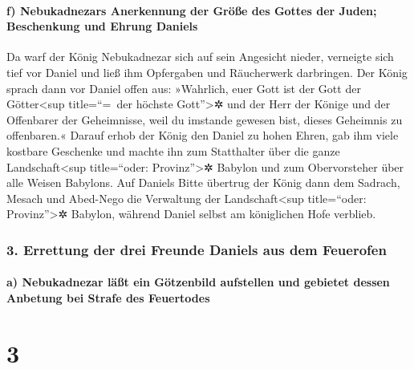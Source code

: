 \hypertarget{f-nebukadnezars-anerkennung-der-gruxf6uxdfe-des-gottes-der-juden-beschenkung-und-ehrung-daniels}{%
\paragraph{f) Nebukadnezars Anerkennung der Größe des Gottes der Juden;
Beschenkung und Ehrung
Daniels}\label{f-nebukadnezars-anerkennung-der-gruxf6uxdfe-des-gottes-der-juden-beschenkung-und-ehrung-daniels}}

Da warf der König Nebukadnezar sich auf sein Angesicht
nieder, verneigte sich tief vor Daniel und ließ ihm Opfergaben und
Räucherwerk darbringen. Der König sprach dann vor Daniel
offen aus: »Wahrlich, euer Gott ist der Gott der Götter\textless sup
title=``=~der höchste Gott''\textgreater✲ und der Herr der Könige und
der Offenbarer der Geheimnisse, weil du imstande gewesen bist, dieses
Geheimnis zu offenbaren.« Darauf erhob der König den
Daniel zu hohen Ehren, gab ihm viele kostbare Geschenke und machte ihn
zum Statthalter über die ganze Landschaft\textless sup title=``oder:
Provinz''\textgreater✲ Babylon und zum Obervorsteher über alle Weisen
Babylons. Auf Daniels Bitte übertrug der König dann dem
Sadrach, Mesach und Abed-Nego die Verwaltung der Landschaft\textless sup
title=``oder: Provinz''\textgreater✲ Babylon, während Daniel selbst am
königlichen Hofe verblieb.

\hypertarget{errettung-der-drei-freunde-daniels-aus-dem-feuerofen}{%
\subsubsection{3. Errettung der drei Freunde Daniels aus dem
Feuerofen}\label{errettung-der-drei-freunde-daniels-aus-dem-feuerofen}}

\hypertarget{a-nebukadnezar-luxe4uxdft-ein-guxf6tzenbild-aufstellen-und-gebietet-dessen-anbetung-bei-strafe-des-feuertodes}{%
\paragraph{a) Nebukadnezar läßt ein Götzenbild aufstellen und gebietet
dessen Anbetung bei Strafe des
Feuertodes}\label{a-nebukadnezar-luxe4uxdft-ein-guxf6tzenbild-aufstellen-und-gebietet-dessen-anbetung-bei-strafe-des-feuertodes}}

\hypertarget{section-2}{%
\section{3}\label{section-2}}

